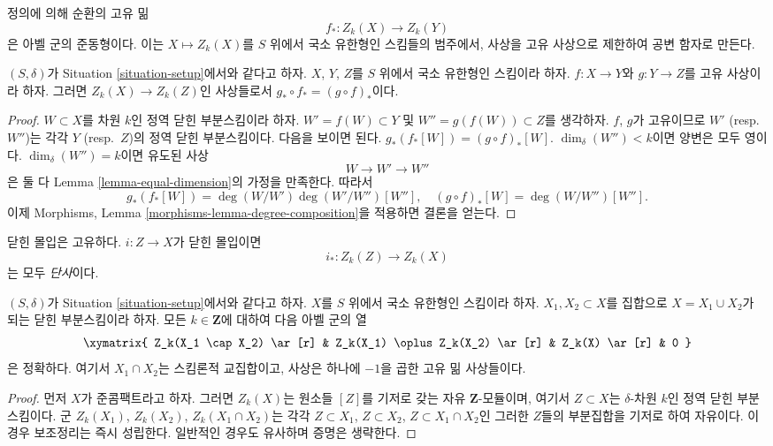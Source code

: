 \noindent
정의에 의해 순환의 고유 밂
$$
f_* : Z_k(X) \longrightarrow Z_k(Y)
$$
은 아벨 군의 준동형이다. 이는 $X \mapsto Z_k(X)$를 $S$ 위에서
국소 유한형인 스킴들의 범주에서, 사상을 고유 사상으로 제한하여
공변 함자로 만든다.

\begin{lemma}
\label{lemma-compose-pushforward}
$(S, \delta)$가 Situation \ref{situation-setup}에서와 같다고 하자.
$X$, $Y$, $Z$를 $S$ 위에서 국소 유한형인 스킴이라 하자.
$f : X \to Y$와 $g : Y \to Z$를 고유 사상이라 하자.
그러면 $Z_k(X) \to Z_k(Z)$인 사상들로서
$g_* \circ f_* = (g \circ f)_*$이다.
\end{lemma}

\begin{proof}
$W \subset X$를 차원 $k$인 정역 닫힌 부분스킴이라 하자.
$W' = f(W) \subset Y$ 및 $W'' = g(f(W)) \subset Z$를 생각하자.
$f$, $g$가 고유이므로 $W'$ (resp.\ $W''$)는 각각 $Y$
(resp.\ $Z$)의 정역 닫힌 부분스킴이다.
다음을 보이면 된다.
$g_*(f_*[W]) = (g \circ f)_*[W]$.
$\dim_\delta(W'') < k$이면 양변은 모두 영이다.
$\dim_\delta(W'') = k$이면 유도된 사상
$$
W \longrightarrow
W' \longrightarrow
W''
$$
은 둘 다 Lemma \ref{lemma-equal-dimension}의 가정을 만족한다. 따라서
$$
g_*(f_*[W]) = \deg(W/W')\deg(W'/W'')[W''],
\quad
(g \circ f)_*[W] = \deg(W/W'')[W''].
$$
이제 Morphisms, Lemma \ref{morphisms-lemma-degree-composition}을
적용하면 결론을 얻는다.
\end{proof}

\noindent
닫힌 몰입은 고유하다. $i : Z \to X$가 닫힌 몰입이면
$$
i_* : Z_k(Z) \longrightarrow Z_k(X)
$$
는 모두 {\it 단사}이다.

\begin{lemma}
\label{lemma-exact-sequence-closed}
$(S, \delta)$가 Situation \ref{situation-setup}에서와 같다고 하자.
$X$를 $S$ 위에서 국소 유한형인 스킴이라 하자. $X_1, X_2 \subset X$를
집합으로 $X = X_1 \cup X_2$가 되는 닫힌 부분스킴이라 하자.
모든 $k \in \mathbf{Z}$에 대하여 다음 아벨 군의 열
$$
\xymatrix{
Z_k(X_1 \cap X_2) \ar[r] &
Z_k(X_1) \oplus Z_k(X_2) \ar[r] &
Z_k(X) \ar[r] &
0
}
$$
은 정확하다. 여기서 $X_1 \cap X_2$는 스킴론적 교집합이고,
사상은 하나에 $-1$을 곱한 고유 밂 사상들이다.
\end{lemma}

\begin{proof}
먼저 $X$가 준콤팩트라고 하자. 그러면 $Z_k(X)$는
원소들 $[Z]$를 기저로 갖는 자유 $\mathbf{Z}$-모듈이며, 여기서
$Z \subset X$는 $\delta$-차원 $k$인 정역 닫힌 부분스킴이다.
군 $Z_k(X_1)$, $Z_k(X_2)$, $Z_k(X_1 \cap X_2)$는 각각
$Z \subset X_1$, $Z \subset X_2$, $Z \subset X_1 \cap X_2$인
그러한 $Z$들의 부분집합을 기저로 하여 자유이다.
이 경우 보조정리는 즉시 성립한다. 일반적인 경우도 유사하며 증명은
생략한다.
\end{proof}

